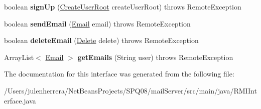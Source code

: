 \begin{DoxyCompactItemize}
\mbox{\label{interface_r_m_i_interface_a39fbf15bb1115837ce6025aaa47784bb}} 
boolean {\bfseries sign\+Up} (\hyperlink{class_create_user_root}{Create\+User\+Root} create\+User\+Root)  throws Remote\+Exception
\item 
\mbox{\label{interface_r_m_i_interface_ad86e01382cdb0cb8a64710a7e9102524}} 
boolean {\bfseries send\+Email} (\hyperlink{class_email}{Email} email)  throws Remote\+Exception
\item 
\mbox{\label{interface_r_m_i_interface_a86bc2a5cb0bdb04a1aeb9b36e373cd5e}} 
boolean {\bfseries delete\+Email} (\hyperlink{class_delete}{Delete} delete)  throws Remote\+Exception
\item 
\mbox{\label{interface_r_m_i_interface_ad326010c8c132dd3398a4443cf827601}} 
Array\+List$<$ \hyperlink{class_email}{Email} $>$ {\bfseries get\+Emails} (String user)  throws Remote\+Exception
\end{DoxyCompactItemize}


The documentation for this interface was generated from the following file\+:\begin{DoxyCompactItemize}
\item 
/\+Users/julenherrera/\+Net\+Beans\+Projects/\+S\+P\+Q08/mail\+Server/src/main/java/R\+M\+I\+Interface.\+java\end{DoxyCompactItemize}
